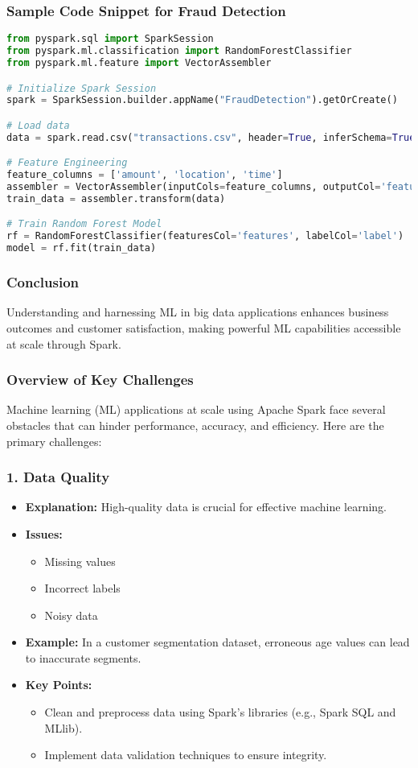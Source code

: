 \documentclass[aspectratio=169]{beamer}
\begin{document}
\begin{frame}[fragile]
    \frametitle{Sample Code Snippet for Fraud Detection}
    \begin{lstlisting}[language=Python]
from pyspark.sql import SparkSession
from pyspark.ml.classification import RandomForestClassifier
from pyspark.ml.feature import VectorAssembler

# Initialize Spark Session
spark = SparkSession.builder.appName("FraudDetection").getOrCreate()

# Load data
data = spark.read.csv("transactions.csv", header=True, inferSchema=True)

# Feature Engineering
feature_columns = ['amount', 'location', 'time']
assembler = VectorAssembler(inputCols=feature_columns, outputCol='features')
train_data = assembler.transform(data)

# Train Random Forest Model
rf = RandomForestClassifier(featuresCol='features', labelCol='label')
model = rf.fit(train_data)
    \end{lstlisting}
\end{frame}

\begin{frame}
    \frametitle{Conclusion}
    Understanding and harnessing ML in big data applications enhances business outcomes and customer satisfaction, making powerful ML capabilities accessible at scale through Spark.
\end{frame}

\begin{frame}[fragile]
    \frametitle{Overview of Key Challenges}
    Machine learning (ML) applications at scale using Apache Spark face several obstacles that can hinder performance, accuracy, and efficiency. Here are the primary challenges:
\end{frame}

\begin{frame}[fragile]
    \frametitle{1. Data Quality}
    \begin{itemize}
        \item \textbf{Explanation:} High-quality data is crucial for effective machine learning.
        \item \textbf{Issues:} 
        \begin{itemize}
            \item Missing values
            \item Incorrect labels
            \item Noisy data
        \end{itemize}
        \item \textbf{Example:} In a customer segmentation dataset, erroneous age values can lead to inaccurate segments.
        \item \textbf{Key Points:}
        \begin{itemize}
            \item Clean and preprocess data using Spark's libraries (e.g., Spark SQL and MLlib).
            \item Implement data validation techniques to ensure integrity.
        \end{itemize}
    \end{itemize}
\end{frame}
\end{document}
